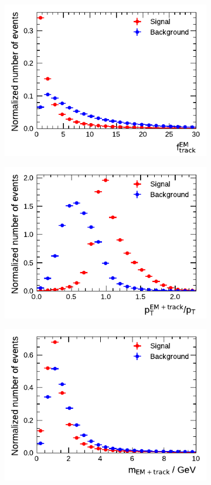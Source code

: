 \begin{figure}[!ht]\ContinuedFloat
  \begin{subfigure}{0.5\textwidth}
    \centering
    \includegraphics{./figures/baseline_bdt_vars/1p/EMPOverTrkSysP.pdf}
  \end{subfigure}%
  \begin{subfigure}{0.5\textwidth}
    \centering
    \includegraphics{./figures/baseline_bdt_vars/1p/ptRatioEflowApprox.pdf}
  \end{subfigure}
  \begin{subfigure}{0.5\textwidth}
    \centering
    \includegraphics{./figures/baseline_bdt_vars/1p/mEflowApprox.pdf}

\end{subfigure}
\end{figure}
